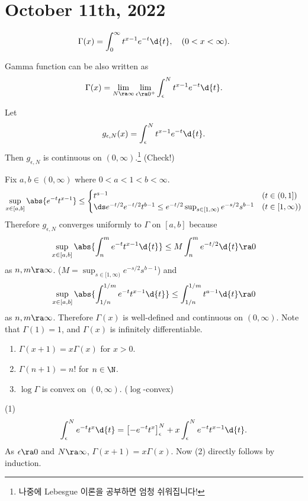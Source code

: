 \section*{October 11th, 2022}

 
\[
    \Gamma (x) = \int_0^\infty t^{x-1} e^{-t}\d{t}, \quad (0 < x < \infty).
\]

\rmk Gamma function can be also written as
\[
    \Gamma(x) = \lim_{N \ra \infty} \lim_{\epsilon \ra 0^+} \int_\epsilon^N t^{x-1}e^{-t}\d{t}.
\]

Let
\[
    g_{\epsilon, N}(x) = \int_{\epsilon}^{N} t^{x-1}e^{-t}\d{t}.
\]
Then \(g_{\epsilon, N}\) is continuous on \((0, \infty)\).\footnote{나중에 Lebesgue 이론을 공부하면 엄청 쉬워집니다!} (Check!)

Fix \(a, b \in (0, \infty)\) where \(0 < a < 1 < b < \infty\).
\[
    \sup_{x\in [a, b]}\abs{e^{-t}t^{x-1}} \leq \begin{cases}
        t^{a-1}                                                                            & (t \in (0, 1])     \\
        \ds e^{-t/2}e^{-t/2} t^{b-1} \leq e^{-t/2} \sup_{s\in [1, \infty)} e^{-s/2}s^{b-1} & (t\in [1, \infty))
    \end{cases}
\]
Therefore \(g_{\epsilon, N}\) converges uniformly to \(\Gamma\) on \([a, b]\) because
\[
    \sup_{x\in [a, b]} \abs{\int_n^m e^{-t}t^{x-1}\d{t}} \leq M \int_n^m e^{-t/2}\d{t} \ra 0
\]
as \(n, m \ra \infty\). (\(M = \sup_{s\in [1, \infty)} e^{-s/2}s^{b-1}\)) and
\[
    \sup_{x\in [a, b]} \abs{\int_{1/n}^{1/m} e^{-t}t^{x-1}\d{t}} \leq \int_{1/n}^{1/m} t^{a-1}\d{t} \ra 0
\]
as \(n, m \ra\infty\). Therefore \(\Gamma(x)\) is well-defined and continuous on \((0, \infty)\). Note that \(\Gamma(1) = 1\), and \(\Gamma(x)\) is infinitely differentiable.

\begin{enumerate}
    \item \(\Gamma(x + 1) = x \Gamma(x)\) for \(x > 0\).
    \item \(\Gamma(n + 1) = n!\) for \(n \in \N\).
    \item \(\log \Gamma\) is convex on \((0, \infty)\). (\(\log\)-convex)
\end{enumerate}

\pf
(1)
\[
    \int_\epsilon^N e^{-t}t^x \d{t} = \left[-e^{-t}t^{x}\right]_{\epsilon}^N + x \int_{\epsilon}^N e^{-t}t^{x-1}\d{t}.
\]
As \(\epsilon \ra 0\) and \(N \ra \infty\), \(\Gamma(x + 1) = x\Gamma(x)\). Now (2) directly follows by induction.

